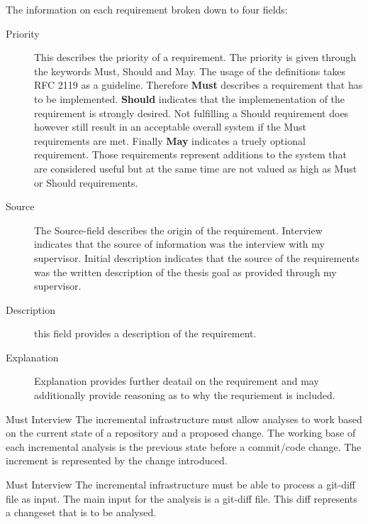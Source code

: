 \documentclass[a4paper]{article}
\begin{document}
The information on each requirement broken down to four fields:

\begin{description}
    \item [Priority]
	This describes the priority of a requirement. The priority is given through the keywords Must, Should and May. The usage of the definitions takes RFC 2119 \cite{RFC-bum} as a guideline. Therefore \textbf{Must} describes a requirement that has to be implemented. \textbf{Should} indicates that the implemenentation of the requirement is strongly desired. Not fulfilling a Should requirement  does however still result in an acceptable overall system if the Must requirements are met. Finally \textbf{May} indicates a truely optional requirement. Those requirements represent additions to the system that are considered useful but at the same time are not valued as high as Must or Should requirements.
    \item [Source]
    The Source-field describes the origin of the requirement. Interview indicates that the source of information was the interview with my supervisor. Initial description indicates that the source of the requirements was the written description of the thesis goal as provided through my supervisor.
    \item [Description]
    this field provides a description of the requirement.
    \item [Explanation]
    Explanation provides further deatail on the requirement and may additionally provide reasoning as to why the requriement is included.
\end{description}

\begin{req} \label{req:working-base}
	\reqtable
	{Must}  {Interview}
	{The incremental infrastructure must allow analyses to work based on the current state of a repository and a proposed change.}
	{The working base of each incremental analysis is the previous state before a commit/code change. The increment is represented by the change introduced.}
	
	\begin{subreq} \label{req:git-diff}
		\reqtable
		{Must}  {Interview}
		{The incremental infrastructure must be able to process a git-diff file as input.}
		{The main input for the analysis is a git-diff file. This diff represents a changeset that is to be analysed.}
	\end{subreq}
\end{req}
\end{document}
